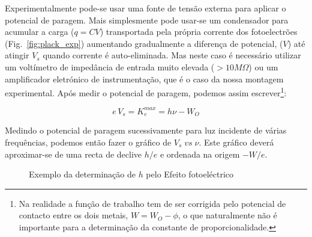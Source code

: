 \documentclass[a4paper,12pt]{article}  %
\begin{document}
Experimentalmente pode-se usar uma fonte de tensão externa para aplicar o potencial de paragem. Mais simplesmente pode usar-se um condensador para acumular a carga ($q=C V$) transportada pela própria corrente dos fotoelectrões (Fig.~\ref{fig:plack_exp}) aumentando gradualmente a diferença de potencial, ($V$) até atingir $V_s$ quando corrente é  auto-eliminada. Mas neste caso é necessário utilizar um voltímetro de impedância de entrada muito elevada ($> 10 M\Omega$) ou um amplificador eletrónico de instrumentação, que é o caso da nossa montagem experimental.
 Após medir o potencial de paragem, podemos assim escrever\footnote{Na realidade a função de trabalho tem de ser corrigida pelo potencial de contacto entre os dois metais, $W=W_O - \phi$, o que naturalmente não é importante para a determinação da constante de proporcionalidade.}:

\begin{equation}
	\label{eq:energia}
	e\,V_s= K_e^{max}= h \nu - W_O
\end{equation}

Medindo o potencial de paragem sucessivamente para luz incidente de várias frequências, podemos então fazer o gráfico de $V_s\; vs \;\nu$. Este gráfico deverá aproximar-se de uma recta de declive $h/e$ e ordenada na origem  $-W/e$.


\begin{figure}[htb]   
\begin{center}
  \sansmath

	\caption{Exemplo da determinação de $h$ pelo Efeito fotoeléctrico}
	 \label{fig:hplot} 
	\end{center}
\end{figure}
\end{document}
